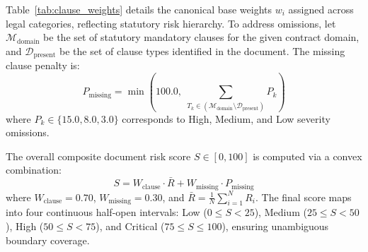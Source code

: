 \documentclass[conference]{IEEEtran}
\begin{document}


Table~\ref{tab:clause_weights} details the canonical base weights $w_i$ assigned across legal categories, reflecting statutory risk hierarchy. To address omissions, let $\mathcal{M}_{\text{domain}}$ be the set of statutory mandatory clauses for the given contract domain, and $\mathcal{D}_{\text{present}}$ be the set of clause types identified in the document. The missing clause penalty is:
\begin{equation}
P_{\text{missing}} = \min\left(100.0,\; \sum_{T_k \in (\mathcal{M}_{\text{domain}} \setminus \mathcal{D}_{\text{present}})} P_k\right)
\label{eq:missing_penalty}
\end{equation}
where $P_k \in \{15.0, 8.0, 3.0\}$ corresponds to High, Medium, and Low severity omissions.

The overall composite document risk score $S \in [0, 100]$ is computed via a convex combination:
\begin{equation}
S = W_{\text{clause}} \cdot \bar{R} + W_{\text{missing}} \cdot P_{\text{missing}}
\label{eq:composite_score}
\end{equation}
where $W_{\text{clause}} = 0.70$, $W_{\text{missing}} = 0.30$, and $\bar{R} = \frac{1}{N} \sum_{i=1}^N R_i$. The final score maps into four continuous half-open intervals: Low ($0 \le S < 25$), Medium ($25 \le S < 50$), High ($50 \le S < 75$), and Critical ($75 \le S \le 100$), ensuring unambiguous boundary coverage.
\end{document}
